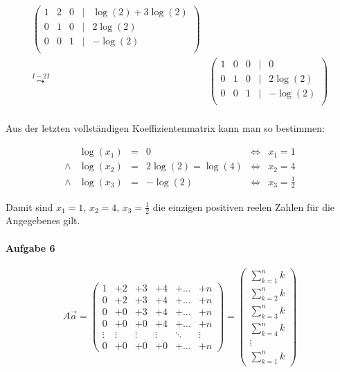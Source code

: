 \documentclass[a4paper,12pt]{article}
\begin{document}
\[\begin{aligned}
\begin{pmatrix}
                                                    1 & 2 & 0 & | & \log(2)+3\log(2) \\
                                                    0 & 1 & 0 & | & 2\log(2)         \\
                                                    0 & 0 & 1 & | & -\log(2)         \\
                                                \end{pmatrix}     \\
        \overset{I-2I}\leadsto                & \begin{pmatrix}
                                                    1 & 0 & 0 & | & 0        \\
                                                    0 & 1 & 0 & | & 2\log(2) \\
                                                    0 & 0 & 1 & | & -\log(2) \\
                                                \end{pmatrix}             \\
    \end{aligned}
\]

Aus der letzten vollständigen Koeffizientenmatrix kann man so bestimmen:

\[
    \begin{aligned}
              & \log(x_1) & = & 0                & \iff & x_1=1           \\
        \land & \log(x_2) & = & 2\log(2)=\log(4) & \iff & x_2=4           \\
        \land & \log(x_3) & = & -\log(2)         & \iff & x_3=\frac{1}{2}
    \end{aligned}
\]

Damit sind $x_1=1$, $x_2=4$, $x_3=\frac{1}{2}$ die einzigen positiven reelen Zahlen für die
Angegebenes gilt.

\paragraph{Aufgabe 6}
\[
    A\vec a=\begin{pmatrix}
        1      & +2     & +3     & +4     & +\dots & +n     \\
        0      & +2     & +3     & +4     & +\dots & +n     \\
        0      & +0     & +3     & +4     & +\dots & +n     \\
        0      & +0     & +0     & +4     & +\dots & +n     \\
        \vdots & \vdots & \vdots & \vdots & \ddots & \vdots \\
        0      & +0     & +0     & +0     & +\dots & +n
    \end{pmatrix}=\begin{pmatrix}
        \sum_{k=1}^nk \\\sum_{k=2}^nk\\\sum_{k=3}^nk\\\sum_{k=4}^nk\\\vdots\\\sum_{k=1}^nk
    \end{pmatrix}
\]
\end{document}
